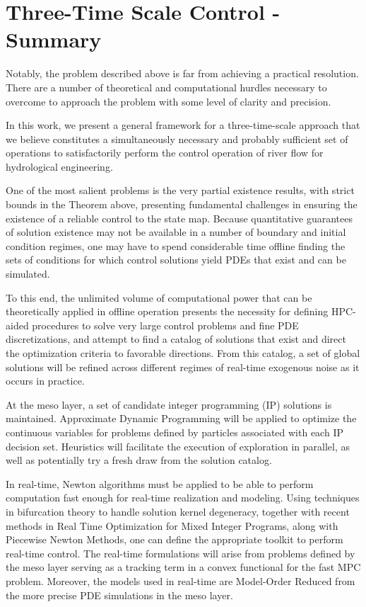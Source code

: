 \documentclass{article}
\newcommand{\1}{\mathds{1}}          %
\theoremstyle{definition}
\begin{document}
\begin{sloppypar}
\section{Three-Time Scale Control - Summary}

Notably, the problem described above is far from achieving a practical resolution. There are a number of theoretical and computational hurdles necessary to overcome to approach the problem with some level of clarity and precision. 

In this work, we present a general framework for a three-time-scale approach that we believe constitutes a simultaneously necessary and probably sufficient set of operations to satisfactorily perform the control operation of river flow for hydrological engineering.

One of the most salient problems is the very partial existence results, with strict bounds in the Theorem above, presenting fundamental challenges in ensuring the existence of a reliable control to the state map. Because quantitative guarantees of solution existence may not be available in a number of boundary and initial condition regimes, one may have to spend considerable time offline finding the sets of conditions for which control solutions yield PDEs that exist and can be simulated. 

To this end, the unlimited volume of computational power that can be theoretically applied in offline operation presents the necessity for defining HPC-aided procedures to solve very large control problems and fine PDE discretizations, and attempt to find a catalog of solutions that exist and direct the optimization criteria to favorable directions. From this catalog, a set of global solutions will be refined across different regimes of real-time exogenous noise as it occurs in practice. 

At the meso layer, a set of candidate integer programming (IP) solutions is maintained. Approximate Dynamic Programming will be applied to optimize the continuous variables for problems defined by particles associated with each IP decision set. Heuristics will facilitate the execution of exploration in parallel, as well as potentially try a fresh draw from the solution catalog. 

In real-time, Newton algorithms must be applied to be able to perform computation fast enough for real-time realization and modeling. Using techniques in bifurcation theory to handle solution kernel degeneracy, together with recent methods in Real Time Optimization for Mixed Integer Programs, along with Piecewise Newton Methods, one can define the appropriate toolkit to perform real-time control. The real-time formulations will arise from problems defined by the meso layer serving as a tracking term in a convex functional for the fast MPC problem. Moreover, the models used in real-time are Model-Order Reduced from the more precise PDE simulations in the meso layer.


\end{sloppypar}
\end{document}
